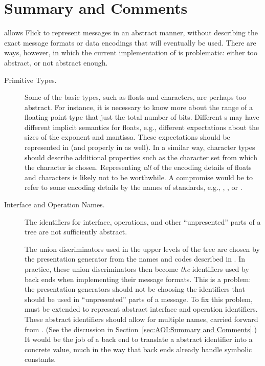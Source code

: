 

\section{Summary and Comments}
\label{sec:MINT:Summary and Comments}

\MINT{} allows Flick to represent messages in an abstract manner, without
describing the exact message formats or data encodings that will eventually be
used.  There are ways, however, in which the current implementation of \MINT{}
is problematic: either too abstract, or not abstract enough.

\begin{description}
  \item[Primitive \MINT{} Types.]
  Some of the basic \MINT{} types, such as floats and characters, are perhaps
  too abstract.
  For instance, it is necessary to know more about the range of a
  floating-point type that just the total number of bits.  Different \IDL{}s
  may have different implicit semantics for floats, e.g., different
  expectations about the sizes of the exponent and mantissa.  These
  expectations should be represented in \MINT{} (and properly in \AOI{} as
  well).  In a similar way, character types should describe additional
  properties such as the character set from which the character is chosen.
  Representing \emph{all} of the encoding details of floats and characters is
  likely not to be worthwhile.  A compromise would be to refer to some encoding
  details by the names of standards, e.g., ,
  , or \@.

  \item[Interface and Operation Names.]
  The identifiers for interface, operations, and other ``unpresented'' parts of
  a \MINT{} tree are not sufficiently abstract.

  The union discriminators used in the upper levels of the \MINT{} tree are
  chosen by the presentation generator from the names and codes described in
  \AOI{}\@.  In practice, these \MINT{} union discriminators then become
  \emph{the} identifiers used by back ends when implementing their message
  formats.  This is a problem: the presentation generators should not be
  choosing the identifiers that should be used in ``unpresented'' parts of a
  message.  To fix this problem, \MINT{} must be extended to represent abstract
  interface and operation identifiers.  These abstract identifiers should allow
  for multiple names, carried forward from \AOI{}\@.  (See the discussion in
  Section~\ref{sec:AOI:Summary and Comments}.)  It would be the job of a back
  end to translate a \MINT{} abstract identifier into a concrete value, much in
  the way that back ends already handle \MINT{} symbolic constants.
\end{description}

